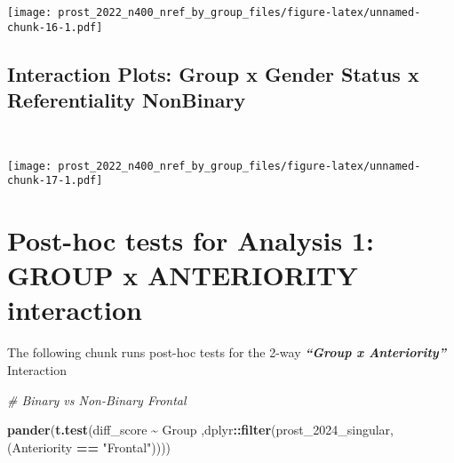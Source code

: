 \documentclass[
]{article}
\newenvironment{Shaded}{\begin{snugshade}}{\end{snugshade}}
\newcommand{\CommentTok}[1]{\textcolor[rgb]{0.56,0.35,0.01}{\textit{#1}}}
\newcommand{\FunctionTok}[1]{\textcolor[rgb]{0.13,0.29,0.53}{\textbf{#1}}}
\newcommand{\NormalTok}[1]{#1}
\newcommand{\SpecialCharTok}[1]{\textcolor[rgb]{0.81,0.36,0.00}{\textbf{#1}}}
\newcommand{\StringTok}[1]{\textcolor[rgb]{0.31,0.60,0.02}{#1}}
\begin{document}
\texttt{[image: prost\_2022\_n400\_nref\_by\_group\_files/figure-latex/unnamed-chunk-16-1.pdf]}

\subsection{Interaction Plots: Group x Gender Status x Referentiality
NonBinary}\label{interaction-plots-group-x-gender-status-x-referentiality-nonbinary}

~

\texttt{[image: prost\_2022\_n400\_nref\_by\_group\_files/figure-latex/unnamed-chunk-17-1.pdf]}

\section{Post-hoc tests for Analysis 1: GROUP x ANTERIORITY
interaction}\label{post-hoc-tests-for-analysis-1-group-x-anteriority-interaction}

The following chunk runs post-hoc tests for the 2-way
\textbf{\emph{``Group x Anteriority''}} Interaction

\begin{Shaded}
\begin{Highlighting}[]
\CommentTok{\# Binary vs Non{-}Binary Frontal}

\FunctionTok{pander}\NormalTok{(}\FunctionTok{t.test}\NormalTok{(diff\_score }\SpecialCharTok{\textasciitilde{}}\NormalTok{ Group}
\NormalTok{       ,dplyr}\SpecialCharTok{::}\FunctionTok{filter}\NormalTok{(prost\_2024\_singular, (Anteriority }\SpecialCharTok{==} \StringTok{"Frontal"}\NormalTok{))))}
\end{Highlighting}
\end{Shaded}
\end{document}
